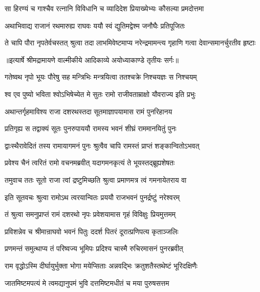 \twolineshloka
{सा हिरण्यं च गाश्चैव रत्नानि विविधानि च}
{व्यादिदेश प्रियाख्येभ्यः कौसल्या प्रमदोत्तमा} %

\twolineshloka
{अथाभिवाद्य राजानं रथमारुह्य राघवः}
{ययौ स्वं द्युतिमद्वेश्म जनौघैः प्रतिपूजितः} %

\fourlineindentedshloka
{ते चापि पौरा नृपतेर्वचस्तत्}
{श्रुत्वा तदा लाभमिवेष्टमाप्य}
{नरेन्द्रमामन्त्य गृहाणि गत्वा}
{देवान्समानर्चुरतीव हृष्टाः} %


{॥इत्यार्षे श्रीमद्रामायणे वाल्मीकीये आदिकाव्ये अयोध्याकाण्डे तृतीयः सर्गः॥}


\twolineshloka
{गतेष्वथ नृपो भूयः पौरेषु सह मन्त्रिभिः}
{मन्त्रयित्वा ततश्चक्रे निश्चयज्ञः स निश्चयम्} %

\twolineshloka
{श्व एव पुष्यो भविता श्वोऽभिषेच्येत मे सुतः}
{रामो राजीवताम्राक्षो यौवराज्य इति प्रभुः} %

\twolineshloka
{अथान्तर्गृहमाविश्य राजा दशरथस्तदा}
{सूतमाज्ञापयामास रामं पुनरिहानय} %

\twolineshloka
{प्रतिगृह्य स तद्वाक्यं सूतः पुनरुपाययौ}
{रामस्य भवनं शीघ्रं राममानयितुं पुनः} %

\twolineshloka
{द्वाःस्थैरावेदितं तस्य रामायागमनं पुनः}
{श्रुत्वैव चापि रामस्तं प्राप्तं शङ्कान्वितोऽभवत्} %

\twolineshloka
{प्रवेश्य चैनं त्वरितं रामो वचनमब्रवीत्}
{यदागमनकृत्यं ते भूयस्तद्ब्रूह्यशेषतः} %

\twolineshloka
{तमुवाच ततः सूतो राजा त्वां द्रष्टुमिच्छति}
{श्रुत्वा प्रमाणमत्र त्वं गमनायेतराय वा} %

\twolineshloka
{इति सूतवचः श्रुत्वा रामोऽथ त्वरयान्वितः}
{प्रययौ राजभवनं पुनर्द्रष्टुं नरेश्वरम्} %

\twolineshloka
{तं श्रुत्वा समनुप्राप्तं रामं दशरथो नृपः}
{प्रवेशयामास गृहं विविक्षुः प्रियमुत्तमम्} %

\twolineshloka
{प्रविशन्नेव च श्रीमान्राघवो भवनं पितुः}
{ददर्श पितरं दूरात्प्रणिपत्य कृताञ्जलिः} %

\twolineshloka
{प्रणमन्तं समुत्थाप्य तं परिष्वज्य भूमिपः}
{प्रदिश्य चास्मै रुचिरमासनं पुनरब्रवीत्} %

\twolineshloka
{राम वृद्धोऽस्मि दीर्घायुर्भुक्ता भोगा मयेप्सिताः}
{अन्नवद्भिः क्रतुशतैस्तथेष्टं भूरिदक्षिणैः} %

\twolineshloka
{जातमिष्टमपत्यं मे त्वमद्यानुपमं भुवि}
{दत्तमिष्टमधीतं च मया पुरुषसत्तम} %

